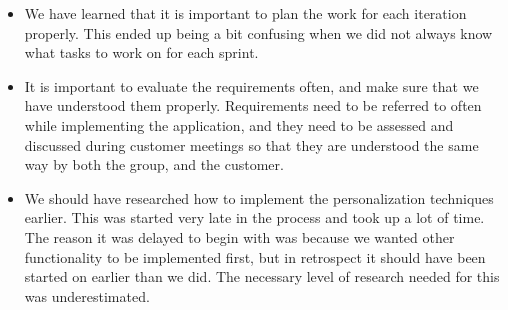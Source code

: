 \begin{itemize}
\item We have learned that it is important to plan the work for each iteration properly. This ended up being a bit confusing when we did not always know what tasks to work on for each sprint.

\item It is important to evaluate the requirements often, and make sure that we have understood them properly. Requirements need to be referred to often while implementing the application, and they need to be assessed and discussed during customer meetings so that they are understood the same way by both the group, and the customer.

\item We should have researched how to implement the personalization techniques earlier. This was started very late in the process and took up a lot of time. The reason it was delayed to begin with was because we wanted other functionality to be implemented first, but in retrospect it should have been started on earlier than we did. The necessary level of research needed for this was underestimated.
\end{itemize}

\cleardoublepage